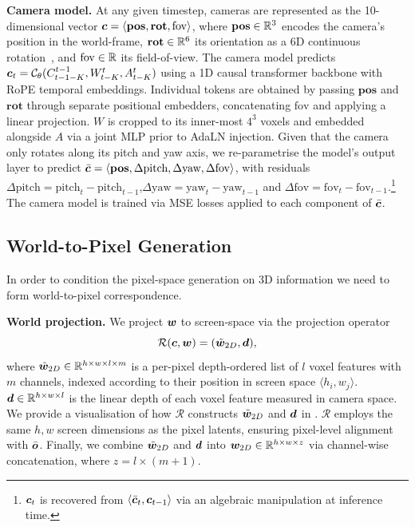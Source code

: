 \documentclass{article}
\theoremstyle{plain}
\theoremstyle{definition}
\theoremstyle{remark}
\begin{document}
\textbf{Camera model.} At any given timestep, cameras are represented as the 10-dimensional vector ${\bm{c}} = \langle\textbf{pos}, \textbf{rot}, \text{fov}\rangle$, where $\textbf{pos}\in {\mathbb{R}}^3$ encodes the camera's position in the world-frame, $\textbf{rot}\in {\mathbb{R}}^6$ its orientation as a 6D continuous rotation~\citep{zhou2019continuity}, and $\text{fov}\in {\mathbb{R}}$ its field-of-view. The camera model predicts ${\bm{c}}_{t} = {\mathcal{C}}_\theta (C^{t-1}_{t-1-K}, W^t_{t-K}, A^t_{t-K})$ using a 1D causal transformer backbone with RoPE temporal embeddings. Individual tokens are obtained by passing $\textbf{pos}$ and $\textbf{rot}$  through separate positional embedders, concatenating $\text{fov}$ and applying a linear projection. $W$ is cropped to its inner-most $4^3$ voxels and embedded alongside $A$ via a joint MLP prior to AdaLN injection. Given that the camera only rotates along its pitch and yaw axis, we re-parametrise the model's output layer to predict $\bar{{\bm{c}}}=\langle \textbf{pos}, \Delta\text{pitch}, \Delta\text{yaw}, \Delta\text{fov}\rangle$, with residuals $\Delta\text{pitch} = \text{pitch}_t - \text{pitch}_{t-1}$,$\Delta\text{yaw} =\text{yaw}_t - \text{yaw}_{t-1}$ and $\Delta \text{fov}=\text{fov}_t - \text{fov}_{t-1}$.\footnote{${\bm{c}}_t$ is recovered from $\langle \bar{{\bm{c}}}_t, {\bm{c}}_{t-1}\rangle$ via an algebraic manipulation at inference time.} The camera model is trained via MSE losses applied to each component of $\bar{{\bm{c}}}$.

\subsection{World-to-Pixel Generation}

In order to condition the pixel-space generation on 3D information we need to form world-to-pixel correspondence.

\textbf{World projection.} We project ${\bm{w}}$ to screen-space via the projection operator \begin{equation}
    \mathcal{R}({\bm{c}}, {\bm{w}}) = (\tilde{{\bm{w}}}_{2D}, {\bm{d}}), 
\end{equation}
where $\tilde{{\bm{w}}}_{2D}  \in \mathbb{R}^{h \times w \times l \times m}$ is a per-pixel depth-ordered list of $l$ voxel features with $m$ channels, indexed according to their position in screen space $\langle h_i, w_j\rangle$. ${\bm{d}} \in \mathbb{R}^{h \times w \times l}$ is the linear depth of each voxel feature measured in camera space. We provide a visualisation of how $\mathcal{R}$ constructs $\tilde{{\bm{w}}}_{2D}$ and ${\bm{d}}$ in . $\mathcal{R}$ employs the same $h,w$ screen dimensions as the pixel latents, ensuring pixel-level alignment with $\bar{{\bm{o}}}$. Finally, we combine $\tilde{{\bm{w}}}_{2D}$ and ${\bm{d}}$ into ${\bm{w}}_{2D}\in \mathbb{R}^{h \times w \times z}$ via channel-wise concatenation, where $z = l \times (m+1)$. %
\end{document}
